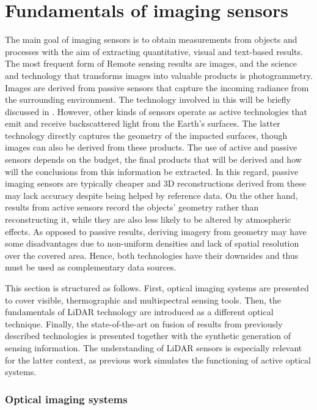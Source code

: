 \setchapterpreamble[u]{\margintoc}
\chapter{Fundamentals of imaging sensors}
\label{sec:fundamentals_rs}

The main goal of imaging sensors is to obtain measurements from objects and processes with the aim of extracting quantitative, visual and text-based results. The most frequent form of \gls{Remote sensing} results are images, and the science and technology that transforms images into valuable products is photogrammetry. Images are derived from passive sensors that capture the incoming radiance from the surrounding environment. The technology involved in this will be briefly discussed in \nameref{}. However, other kinds of sensors operate as active technologies that emit and receive backscattered light from the Earth's surfaces. The latter technology directly captures the geometry of the impacted surfaces, though images can also be derived from these products. The use of active and passive sensors depends on the budget, the final products that will be derived and how will the conclusions from this information be extracted. In this regard, passive imaging sensors are typically cheaper and 3D reconstructions derived from these may lack accuracy despite being helped by reference data. On the other hand, results from active sensors record the objects' geometry rather than reconstructing it, while they are also less likely to be altered by atmospheric effects. As opposed to passive results, deriving imagery from geometry may have some disadvantages due to non-uniform densities and lack of spatial resolution over the covered area. Hence, both technologies have their downsides and thus must be used as complementary data sources.

This section is structured as follows. First, optical imaging systems are presented to cover visible, thermographic and multispectral sensing tools. Then, the fundamentals of LiDAR technology are introduced as a different optical technique. Finally, the state-of-the-art on fusion of results from previously described technologies is presented together with the synthetic generation of sensing information. The understanding of LiDAR sensors is especially relevant for the latter context, as previous work simulates the functioning of active optical systems. 

\subsection{Optical imaging systems}

